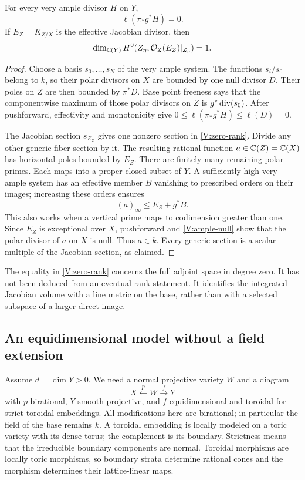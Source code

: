 \begin{lemma}\label{V:null-rank}
For every very ample divisor $H$ on $Y$,
\begin{equation}\label{V:ample-null}
 \ell(\pi_*g^*H)=0.
\end{equation}
If $E_Z=K_{Z/X}$ is the effective Jacobian divisor, then
\begin{equation}\label{V:zero-rank}
 \dim_{\mathbb C(Y)}H^0(Z_\eta,\mathcal O_Z(E_Z)|_{Z_\eta})=1.
\end{equation}
\end{lemma}
\begin{proof}
Choose a basis $s_0,\ldots,s_N$ of the very ample system. The functions
$s_i/s_0$ belong to $k$, so their polar divisors on $X$ are bounded by
one null divisor $D$. Their poles on $Z$ are then bounded by $\pi^*D$.
Base point freeness says that the componentwise maximum of those polar
divisors on $Z$ is $g^*\operatorname{div}(s_0)$. After pushforward, effectivity
and monotonicity give
$0\le\ell(\pi_*g^*H)\le\ell(D)=0$.

The Jacobian section $s_{E_Z}$ gives one nonzero section in
\eqref{V:zero-rank}. Divide any other generic-fiber section by it.
The resulting rational function $a\in\mathbb C(Z)=\mathbb C(X)$ has horizontal
poles bounded by $E_Z$. There are finitely many remaining polar primes.
Each maps into a proper closed subset of $Y$. A sufficiently high very
ample system has an effective member $B$ vanishing to prescribed orders
on their images; increasing these orders ensures
\[
 (a)_\infty\le E_Z+g^*B.
\]
This also works when a vertical prime maps to codimension greater than
one. Since $E_Z$ is exceptional over $X$, pushforward and
\eqref{V:ample-null} show that the polar divisor of $a$ on $X$ is null.
Thus $a\in k$. Every generic section is a scalar multiple of the
Jacobian section, as claimed.
\end{proof}

The equality in \eqref{V:zero-rank} concerns the full adjoint space in
degree zero. It has not been deduced from an eventual rank statement.
It identifies the integrated Jacobian volume with a line metric on the
base, rather than with a selected subspace of a larger direct image.

\subsection{An equidimensional model without a field extension}
Assume $d=\dim Y>0$. We need a normal projective variety $W$ and a
diagram
\begin{equation}\label{V:model}
 X\xleftarrow{\ p\ }W\xrightarrow{\ f\ }Y
\end{equation}
with $p$ birational, $Y$ smooth projective, and $f$ equidimensional
and toroidal for strict toroidal embeddings. All modifications here
are birational; in particular the field of the base remains $k$.
A toroidal embedding is locally modeled on a toric variety with its
dense torus; the complement is its boundary. Strictness means that the
irreducible boundary components are normal. Toroidal morphisms are
locally toric morphisms, so boundary strata determine rational cones and
the morphism determines their lattice-linear maps.

